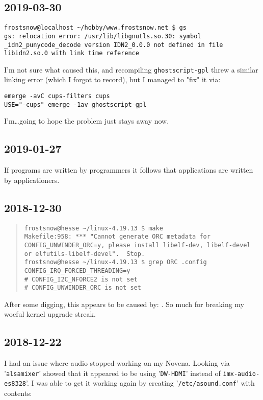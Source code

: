 \documentclass{article}
\begin{document}
\subsection{2019-03-30}
\begin{verbatim}
frostsnow@localhost ~/hobby/www.frostsnow.net $ gs
gs: relocation error: /usr/lib/libgnutls.so.30: symbol _idn2_punycode_decode version IDN2_0.0.0 not defined in file libidn2.so.0 with link time reference
\end{verbatim}
I'm not sure what caused this, and recompiling \texttt{ghostscript-gpl} threw a similar linking error (which I forgot to record), but I managed to "fix" it via:
\begin{verbatim}
emerge -avC cups-filters cups
USE="-cups" emerge -1av ghostscript-gpl
\end{verbatim}
I'm\ldots going to hope the problem just stays away now.

\subsection{2019-01-27}
If programs are written by programmers it follows that applications are written by applicationers.

\subsection{2018-12-30}
\begin{quote}
\begin{verbatim}
frostsnow@hesse ~/linux-4.19.13 $ make
Makefile:958: *** "Cannot generate ORC metadata for CONFIG_UNWINDER_ORC=y, please install libelf-dev, libelf-devel or elfutils-libelf-devel".  Stop.
frostsnow@hesse ~/linux-4.19.13 $ grep ORC .config
CONFIG_IRQ_FORCED_THREADING=y
# CONFIG_I2C_NFORCE2 is not set
# CONFIG_UNWINDER_ORC is not set
\end{verbatim}
\end{quote}
After some digging, this appears to be caused by: .  So much for breaking my woeful kernel upgrade streak.

\subsection{2018-12-22}
I had an issue where audio stopped working on my Novena.  Looking via '\texttt{alsamixer}' showed that it appeared to be using '\texttt{DW-HDMI}' instead of \texttt{imx-audio-es8328}'.  I was able to get it working again by creating '\texttt{/etc/asound.conf}' with contents:
\end{document}
